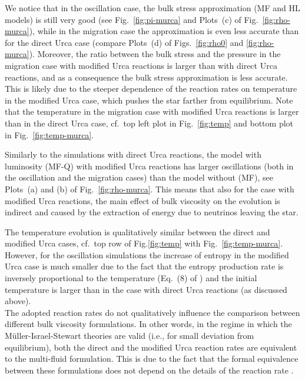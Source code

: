 \documentclass[aps,prd,twocolumn,a4paper,floatfix,nofootbib,superscriptaddress,nofootinbib]{revtex4}
\begin{document}
We notice that in the oscillation case, the bulk stress approximation (MF and
HL models) is still very good (see Fig.~\ref{fig:pi-murca} and Plots~(c) of
Fig.~\ref{fig:rho-murca}), while in the migration case the approximation is
even less accurate than for the direct Urca case (compare Plots~(d) of
Figs.~\ref{fig:rho0} and \ref{fig:rho-murca}).
%
Moreover, the ratio between the bulk stress and the pressure in the migration
case with modified Urca reactions is larger than with direct Urca reactions,
and as a consequence the bulk stress approximation is less accurate.
%
This is likely due to the steeper dependence of the reaction rates on
temperature in the modified Urca case, which pushes the star farther from
equilibrium.
%
Note that the temperature in the migration case with modified Urca reactions is
larger than in the direct Urca case, cf.~top left plot in Fig.~\ref{fig:temp}
and bottom plot in Fig.~\ref{fig:temp-murca}.

Similarly to the simulations with direct Urca reactions, the model with
luminosity (MF-Q) with modified Urca reactions has larger oscillations (both in
the oscillation and the migration cases) than the model without (MF),
see Plots~(a) and (b) of Fig.~\ref{fig:rho-murca}.
%
This means that also for the case with modified Urca reactions, the main effect
of bulk viscosity on the evolution is indirect and caused by the extraction of energy
due to neutrinos leaving the star.

The temperature evolution is qualitatively similar between the direct and
modified Urca cases, cf.~top row of Fig.\ref{fig:temp} with
Fig.~\ref{fig:temp-murca}.
%
However, for the oscillation simulations the increase of entropy in the
modified Urca case is much smaller due to the fact that the entropy production
rate is inversely proportional to the temperature (Eq.~(8) of
\citet{Camelio22a}) and the initial temperature is larger than in the case with
direct Urca reactions (as discussed above).\\

The adopted reaction rates do not qualitatively influence the comparison between
different bulk viscosity formulations.
%
In other words, in the regime in which the M\"uller-Israel-Stewart
theories are valid (i.e., for small deviation from equilibrium),
both the direct and the modified Urca reaction rates are equivalent to the
multi-fluid formulation.
%
This is due to the fact that the formal equivalence between these formulations
does not depend on the details of the reaction rate \cite{Gavassino21bulk}.
\end{document}
